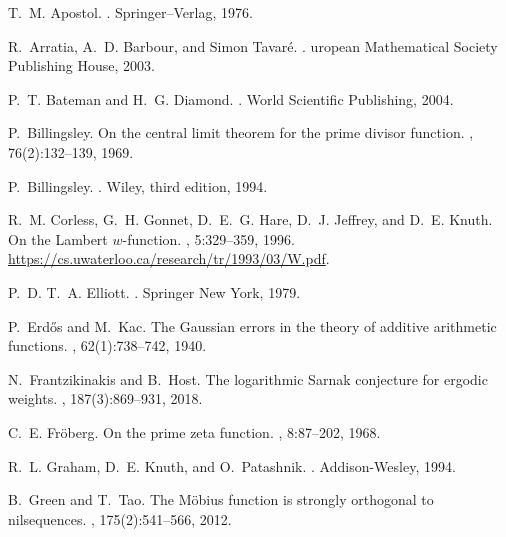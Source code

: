 \documentclass[11pt,reqno,a4letter]{article}
\numberwithin{equation}{section}
\numberwithin{figure}{section}
\numberwithin{table}{section}
\theoremstyle{plain}
\numberwithin{theorem}{section}
\theoremstyle{definition}
\theoremstyle{remark}
\begin{document}
\begin{thebibliography}{10}

T.~M. Apostol.
.
\newblock Springer--Verlag, 1976.

R.~Arratia, A.~D. Barbour, and Simon Tavar{\'{e}}.
.
uropean Mathematical Society Publishing House, 2003.

P.~T. Bateman and H.~G. Diamond.
.
\newblock World Scientific Publishing, 2004.

P.~Billingsley.
\newblock On the central limit theorem for the prime divisor function.
, 76(2):132--139, 1969.

P.~Billingsley.
.
\newblock Wiley, third edition, 1994.

R.~M. Corless, G.~H. Gonnet, D.~E.~G. Hare, D.~J. Jeffrey, and D.~E. Knuth.
\newblock On the {L}ambert $w$-function.
, 5:329--359, 1996.
\newblock \url{https://cs.uwaterloo.ca/research/tr/1993/03/W.pdf}.

P.~D. T.~A. Elliott.
.
\newblock Springer New York, 1979.

P.~Erd{\H{o}}s and M.~Kac.
\newblock The {G}aussian errors in the theory of additive arithmetic functions.
, 62(1):738--742, 1940.

N.~Frantzikinakis and B.~Host.
\newblock The logarithmic {S}arnak conjecture for ergodic weights.
, 187(3):869--931, 2018.

C.~E. Fr{\"{o}}berg.
\newblock On the prime zeta function.
, 8:87--202, 1968.

R.~L. Graham, D.~E. Knuth, and O.~Patashnik.
.
\newblock Addison-Wesley, 1994.

B.~Green and T.~Tao.
\newblock The {M}\"{o}bius function is strongly orthogonal to nilsequences.
, 175(2):541--566, 2012.


\end{thebibliography}
\end{document}
